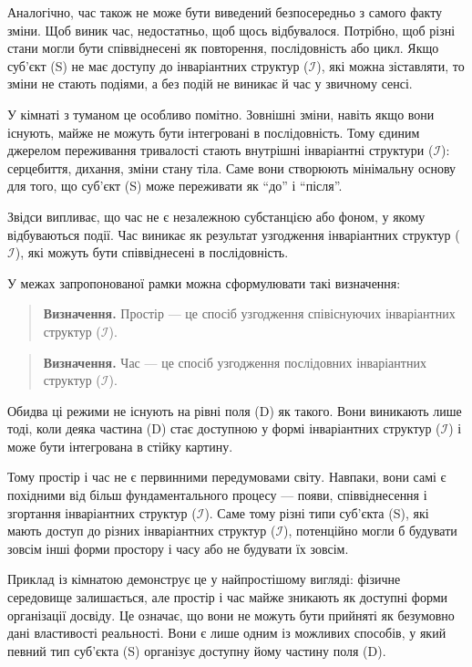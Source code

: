 \documentclass[aps,prd,onecolumn,nofootinbib,superscriptaddress]{revtex4-2} %
\begin{document}
    Аналогічно, час також не може бути виведений безпосередньо з самого факту зміни. Щоб виник час, недостатньо, щоб щось відбувалося. Потрібно, щоб різні стани могли бути співвіднесені як повторення, послідовність або цикл. Якщо суб’єкт (S) не має доступу до інваріантних структур ($\mathcal{I}$), які можна зіставляти, то зміни не стають подіями, а без подій не виникає й час у звичному сенсі.

    У кімнаті з туманом це особливо помітно. Зовнішні зміни, навіть якщо вони існують, майже не можуть бути інтегровані в послідовність. Тому єдиним джерелом переживання тривалості стають внутрішні інваріантні структури ($\mathcal{I}$): серцебиття, дихання, зміни стану тіла. Саме вони створюють мінімальну основу для того, що суб’єкт (S) може переживати як “до” і “після”.

    Звідси випливає, що час не є незалежною субстанцією або фоном, у якому відбуваються події. Час виникає як результат узгодження інваріантних структур ($\mathcal{I}$), які можуть бути співвіднесені в послідовність.

    У межах запропонованої рамки можна сформулювати такі визначення:

    \begin{quote}
        \textbf{Визначення.}
        Простір — це спосіб узгодження співіснуючих інваріантних структур ($\mathcal{I}$).
    \end{quote}

    \begin{quote}
        \textbf{Визначення.}
        Час — це спосіб узгодження послідовних інваріантних структур ($\mathcal{I}$).
    \end{quote}

    Обидва ці режими не існують на рівні поля (D) як такого. Вони виникають лише тоді, коли деяка частина (D) стає доступною у формі інваріантних структур ($\mathcal{I}$) і може бути інтегрована в стійку картину.

    Тому простір і час не є первинними передумовами світу. Навпаки, вони самі є похідними від більш фундаментального процесу — появи, співвіднесення і згортання інваріантних структур ($\mathcal{I}$). Саме тому різні типи суб’єкта (S), які мають доступ до різних інваріантних структур ($\mathcal{I}$), потенційно могли б будувати зовсім інші форми простору і часу або не будувати їх зовсім.

    Приклад із кімнатою демонструє це у найпростішому вигляді: фізичне середовище залишається, але простір і час майже зникають як доступні форми організації досвіду. Це означає, що вони не можуть бути прийняті як безумовно дані властивості реальності. Вони є лише одним із можливих способів, у який певний тип суб’єкта (S) організує доступну йому частину поля (D).
\end{document}
